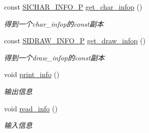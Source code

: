 \begin{DoxyCompactItemize}
\begin{DoxyCompactList}
\end{DoxyCompactList}\item 
const \hyperlink{class_s_i_c_h_a_r___i_n_f_o}{S\+I\+C\+H\+A\+R\+\_\+\+I\+N\+F\+O\+\_\+P} \hyperlink{class_s_i_c_h_a_r_n_o_d_e_a95039205cd53a18d6f1b8ef1a80c90c2}{get\+\_\+char\+\_\+infop} ()
\begin{DoxyCompactList}\small\item\em 得到一个char\+\_\+infop的const副本 \end{DoxyCompactList}\item 
const \hyperlink{class_s_i_d_r_a_w___i_n_f_o}{S\+I\+D\+R\+A\+W\+\_\+\+I\+N\+F\+O\+\_\+P} \hyperlink{class_s_i_c_h_a_r_n_o_d_e_a96a8903f87343bb9096a8ed014e789be}{get\+\_\+draw\+\_\+infop} ()
\begin{DoxyCompactList}\small\item\em 得到一个draw\+\_\+infop的const副本 \end{DoxyCompactList}\item 
\mbox{\label{class_s_i_c_h_a_r_n_o_d_e_a4b4d71bb1d49d56399586b214897bec4}} 
void \hyperlink{class_s_i_c_h_a_r_n_o_d_e_a4b4d71bb1d49d56399586b214897bec4}{print\+\_\+info} ()
\begin{DoxyCompactList}\small\item\em 输出信息 \end{DoxyCompactList}\item 
\mbox{\label{class_s_i_c_h_a_r_n_o_d_e_ae51d8c92371116aedf5510bb3096104c}} 
void \hyperlink{class_s_i_c_h_a_r_n_o_d_e_ae51d8c92371116aedf5510bb3096104c}{read\+\_\+info} ()
\begin{DoxyCompactList}\small\item\em 输入信息 \end{DoxyCompactList}\end{DoxyCompactItemize}
